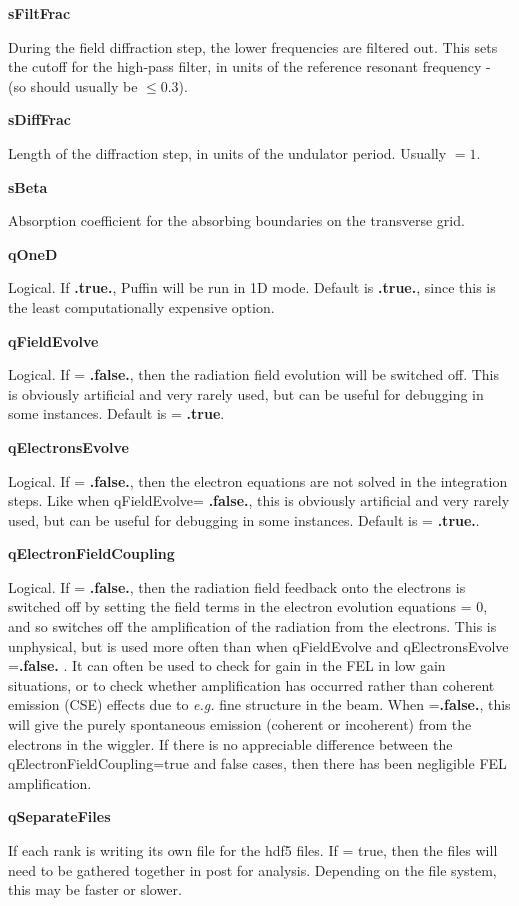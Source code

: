 \documentclass[12pt]{article}%
\begin{document}
{\bf sFiltFrac}

During the field diffraction step, the lower frequencies are filtered out. This sets the cutoff for the high-pass filter, in units of the reference resonant frequency - (so should usually be $\leq 0.3$).

{\bf sDiffFrac}

Length of the diffraction step, in units of the undulator period. Usually $=1$.

{\bf sBeta}

Absorption coefficient for the absorbing boundaries on the transverse grid.

{\bf qOneD}

Logical. If  {\bf .true.}, Puffin will be run in 1D mode. Default is  {\bf .true.}, since this is the least computationally expensive option.

{\bf qFieldEvolve}

Logical. If = {\bf .false.}, then the radiation field evolution will be switched off. This is obviously artificial and very rarely used, but can be useful for debugging in some instances. Default is = {\bf .true}.

{\bf qElectronsEvolve}

Logical. If = {\bf .false.}, then the electron equations are not solved in the integration steps. Like when qFieldEvolve= {\bf .false.},  this is obviously artificial and very rarely used, but can be useful for debugging in some instances. Default is = {\bf .true.}.

{\bf qElectronFieldCoupling}

Logical. If = {\bf .false.}, then the radiation field feedback onto the electrons is switched off by setting the field terms in the electron evolution equations = 0, and so switches off the amplification of the radiation from the electrons. This is unphysical, but is used more often than when qFieldEvolve and qElectronsEvolve ={\bf .false.} . It can often be used to check for gain in the FEL in low gain situations, or to check whether amplification has occurred rather than coherent emission (CSE) effects due to \textit{e.g.} fine structure in the beam. When ={\bf .false.}, this will give the purely spontaneous emission (coherent or incoherent) from the electrons in the wiggler. If there is no appreciable difference between the qElectronFieldCoupling=true and false cases, then there has been negligible FEL amplification.

{\bf qSeparateFiles}

If each rank is writing its own file for the hdf5 files. If = true, then the files will need to be gathered together in post for analysis. Depending on the file system, this may be faster or slower.
\end{document}
